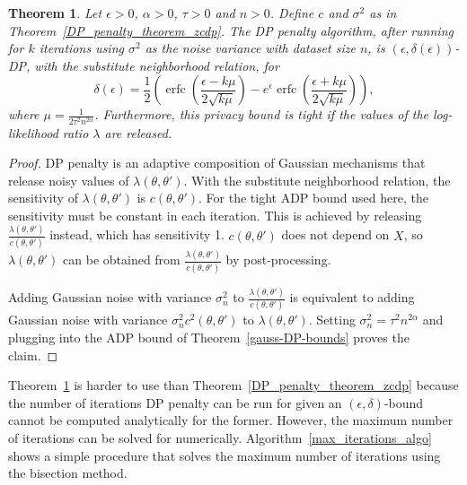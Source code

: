 \documentclass[english,twoside,openright]{HYgraduMLDS}
\newtheorem{theorem}[lemma]{Theorem}
\DeclareMathOperator{\erfc}{erfc}
\begin{document}
\begin{theorem}\label{DP_penalty_theorem_adp}
    Let \(\epsilon > 0\), \(\alpha > 0\), \(\tau > 0\) and \(n > 0\).
    Define \(c\) and \(\sigma^{2}\) as in Theorem~\ref{DP_penalty_theorem_zcdp}.
    The DP penalty algorithm, after running for \(k\) iterations using \(\sigma^{2}\)
    as the noise variance with dataset size \(n\),
    is \((\epsilon, \delta(\epsilon))\)-DP, with the substitute neighborhood
    relation, for
    \[
        \delta(\epsilon) 
        = \frac{1}{2}\left(
            \erfc\left(\frac{\epsilon - k\mu}{2\sqrt{k\mu}}\right)
            - e^\epsilon \erfc\left(\frac{\epsilon + k\mu}{2\sqrt{k\mu}}\right)
        \right),
    \]
    where \(\mu = \frac{1}{2\tau^2 n^{2\alpha}}\). Furthermore, this privacy
    bound is tight if the values of the log-likelihood ratio \(\lambda\) are
    released.
\end{theorem}
\begin{proof}
    DP penalty is an adaptive composition of Gaussian mechanisms that release 
    noisy values of \(\lambda(\theta, \theta')\). With the substitute neighborhood
    relation, the sensitivity of \(\lambda(\theta, \theta')\) is
    \(c(\theta, \theta')\). For the tight ADP bound used here, the sensitivity must be 
    constant in each iteration. This is achieved by releasing 
    \(\frac{\lambda(\theta, \theta')}{c(\theta, \theta')}\) instead, which 
    has sensitivity 1. \(c(\theta, \theta')\) does not depend on \(X\), 
    so \(\lambda(\theta, \theta')\) can be obtained from 
    \(\frac{\lambda(\theta, \theta')}{c(\theta, \theta')}\) by post-processing.

    Adding Gaussian noise with variance \(\sigma_n^2\) to 
    \(\frac{\lambda(\theta, \theta')}{c(\theta, \theta')}\)
    is equivalent to adding Gaussian noise with variance 
    \(\sigma_n^2 c^2(\theta, \theta')\) to \(\lambda(\theta, \theta')\).
    Setting \(\sigma_n^2 = \tau^2n^{2\alpha}\) and plugging into 
    the ADP bound of Theorem~\ref{gauss-DP-bounds} proves the 
    claim.
\end{proof}

Theorem~\ref{DP_penalty_theorem_adp} is harder to use than 
Theorem~\ref{DP_penalty_theorem_zcdp} because the number of iterations
DP penalty can be run for given an \((\epsilon, \delta)\)-bound cannot be 
computed analytically for the former. However, the maximum number of iterations 
can be solved for numerically. Algorithm~\ref{max_iterations_algo} shows a simple
procedure that solves the maximum number of iterations using the bisection
method.
\end{document}

